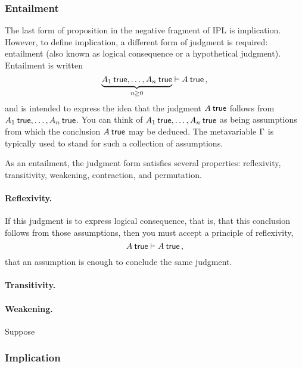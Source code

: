 \documentclass[12pt]{article}
\begin{document}
\subsubsection{Entailment}\label{sec:entailment}

The last form of proposition in the negative fragment of \ac{IPL} is implication.
However, to define implication, a different form of judgment is required: entailment (also known as logical consequence or a hypothetical judgment).
Entailment is written
\begin{equation*}
  \underbrace{A_1 \true, \dotsc, A_n \true}_{n \geq 0} \entails A \true \,,
\end{equation*}
and is intended to express the idea that the judgment $A \true$ follows from $A_1 \true, \dotsc, A_n \true$.
You can think of $A_1 \true, \dotsc, A_n \true$ as being assumptions from which the conclusion $A \true$ may be deduced.
The metavariable $\Gamma$ is typically used to stand for such a collection of assumptions.

As an entailment, the judgment form satisfies several properties: reflexivity, transitivity, weakening, contraction, and permutation.

\paragraph{Reflexivity.}\label{sec:reflexivity}
If this judgment is to express logical consequence, that is, that this conclusion follows from those assumptions, then you must accept a principle of reflexivity,
\begin{equation*}
  A \true \entails A \true \,,
\end{equation*}
that an assumption is enough to conclude the same judgment.

\paragraph{Transitivity.}\label{sec:transitivity}

\paragraph{Weakening.}\label{sec:weakening}
Suppose

\subsubsection{Implication}\label{sec:implication}
\end{document}
